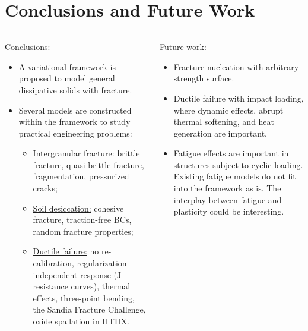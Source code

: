\section{Conclusions and Future Work}
\sectioncover

\begin{frame}
  \begin{columns}
    \begin{column}{0.5\textwidth}
      Conclusions:
      \begin{itemize}
        \setlength\itemsep{5pt}
        \item A variational framework is proposed to model \textcolor{peggyblue}{general dissipative solids with fracture}.
        \item Several models are constructed within the framework to study \textcolor{peggyblue}{practical engineering problems}:
              \begin{itemize}
                \setlength\itemsep{3pt}
                \item \underline{Intergranular fracture:} brittle fracture, quasi-brittle fracture, fragmentation, pressurized cracks;
                \item \underline{Soil desiccation:} cohesive fracture, traction-free BCs, random fracture properties;
                \item \underline{Ductile failure:} no re-calibration, regularization-independent response (J-resistance curves), thermal effects, three-point bending, the Sandia Fracture Challenge, oxide spallation in HTHX.
              \end{itemize}
      \end{itemize}
    \end{column}
    \pause
    \begin{column}{0.5\textwidth}
      Future work:
      \begin{itemize}
        \item Fracture \textcolor{peggyblue}{nucleation with arbitrary strength surface}.
        \item Ductile failure with \textcolor{peggyblue}{impact loading}, where dynamic effects, abrupt thermal softening, and heat generation are important.
        \item \textcolor{peggyblue}{Fatigue} effects are important in structures subject to cyclic loading. Existing fatigue models do not fit into the framework as is. The interplay between fatigue and plasticity could be interesting.
      \end{itemize}
    \end{column}
  \end{columns}
\end{frame}
